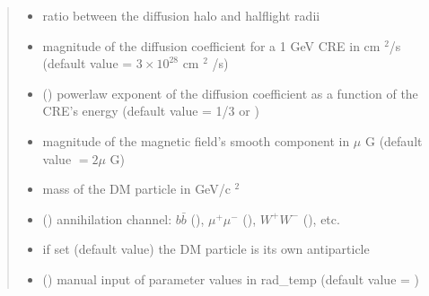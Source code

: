 \documentclass[letterpaper,10pt,english]{sphinxmanual}
\begin{document}
\begin{fulllineitems}
\begin{quote}
\begin{description}
\begin{itemize}
\item {} 
\sphinxAtStartPar
{} \textendash{} ratio between the diffusion halo and half\sphinxhyphen{}light radii

\item {} 
\sphinxAtStartPar
{} \textendash{} magnitude of the diffusion coefficient for a 1 GeV CRE in cm \({}^2\)/s (default value = \(3\times 10^{28}\) cm \({}^2\) /s)

\item {} 
\sphinxAtStartPar
{} (\sphinxstyleliteralemphasis{\sphinxupquote{, }}) \textendash{} power\sphinxhyphen{}law exponent of the diffusion coefficient as a function of the CRE’s energy (default value = 1/3 or )

\item {} 
\sphinxAtStartPar
{} \textendash{} magnitude of the magnetic field’s smooth component in \(\mu\) G (default value \(= 2 \mu\) G)

\item {} 
\sphinxAtStartPar
{} \textendash{} mass of the DM particle in GeV/c \({}^2\)

\item {} 
\sphinxAtStartPar
{} () \textendash{} annihilation channel: \(b\bar b\) (), \(\mu^+ \mu^-\) (), \(W^+ W^-\) (), etc.

\item {} 
\sphinxAtStartPar
{} \textendash{} if set  (default value) the DM particle is its own antiparticle

\item {} 
\sphinxAtStartPar
{} () \textendash{} manual input of parameter values in rad\_temp (default value = )


\end{itemize}
\end{description}
\end{quote}
\end{fulllineitems}
\end{document}
